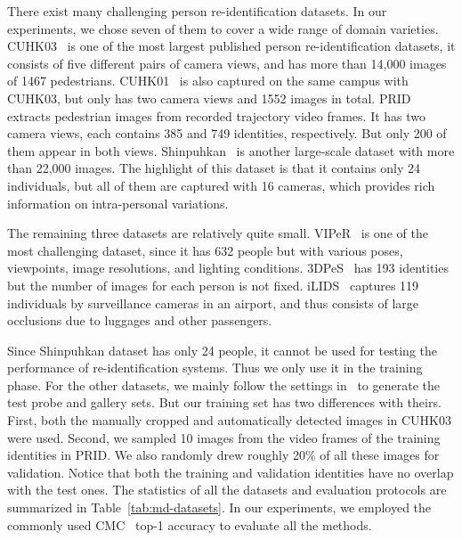 There exist many challenging person re-identification datasets. In our experiments, we chose seven of them to cover a wide range of domain varieties. CUHK03~\cite{li2014deepreid} is one of the most largest published person re-identification datasets, it consists of five different pairs of camera views, and has more than 14,000 images of 1467 pedestrians. CUHK01~\cite{li2013locally} is also captured on the same campus with CUHK03, but only has two camera views and 1552 images in total. PRID~\cite{hirzer11a} extracts pedestrian images from recorded trajectory video frames. It has two camera views, each contains 385 and 749 identities, respectively. But only 200 of them appear in both views. Shinpuhkan~\cite{kawanishi2014shinpuhkan2014} is another large-scale dataset with more than 22,000 images. The highlight of this dataset is that it contains only 24 individuals, but all of them are captured with 16 cameras, which provides rich information on intra-personal variations.

The remaining three datasets are relatively quite small. VIPeR~\cite{gray2007evaluating} is one of the most challenging dataset, since it has 632 people but with various poses, viewpoints, image resolutions, and lighting conditions. 3DPeS~\cite{baltieri20113dpes} has 193 identities but the number of images for each person is not fixed. iLIDS~\cite{zheng2009associating} captures 119 individuals by surveillance cameras in an airport, and thus consists of large occlusions due to luggages and other passengers.

Since Shinpuhkan dataset has only 24 people, it cannot be used for testing the performance of re-identification systems. Thus we only use it in the training phase. For the other datasets, we mainly follow the settings in~\cite{paisitkriangkrai2015learning} to generate the test probe and gallery sets. But our training set has two differences with theirs. First, both the manually cropped and automatically detected images in CUHK03 were used. Second, we sampled 10 images from the video frames of the training identities in PRID. We also randomly drew roughly 20\% of all these images for validation. Notice that both the training and validation identities have no overlap with the test ones. The statistics of all the datasets and evaluation protocols are summarized in Table~\ref{tab:md-datasets}. In our experiments, we employed the commonly used CMC~\cite{moon2001computational} top-1 accuracy to evaluate all the methods.

